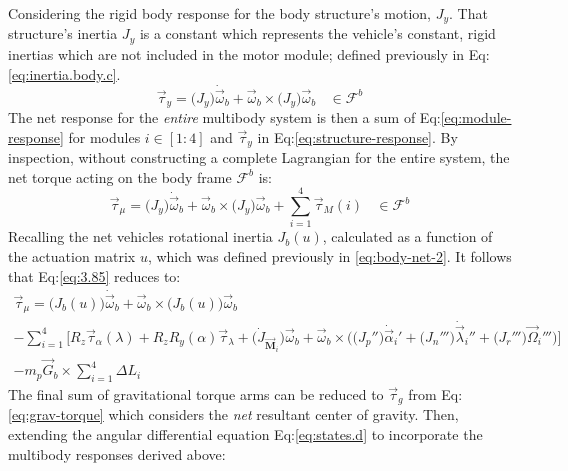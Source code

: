 Considering the rigid body response for the body structure's motion, $J_y$. That structure's inertia $J_y$ is a constant which represents the vehicle's constant, rigid inertias which are not included in the motor module; defined previously in Eq:\ref{eq:inertia.body.c}.
\begin{equation}\label{eq:structure-response}
\vec{\tau}_y=\big(J_y\big)\dot{\vec{\omega}}_b+\vec{\omega}_b\times\big(J_y\big)\vec{\omega}_b~~~~\in\mathcal{F}^b
\end{equation}
The net response for the \emph{entire} multibody system is then a sum of Eq:\ref{eq:module-response} for modules $i\in[1:4]$ and $\vec{\tau}_y$ in Eq:\ref{eq:structure-response}. By inspection, without constructing a complete Lagrangian for the entire system, the net torque acting on the body frame $\mathcal{F}^b$ is:
\begin{equation}\label{eq:3.85}
\vec{\tau}_\mu = \big(J_y\big)\dot{\vec{\omega}}_b+\vec{\omega}_b\times\big(J_y\big)\vec{\omega}_b+\sum_{i=1}^{4}\vec{\tau}_{M}(i)~~~~\in\mathcal{F}^b
\end{equation}
Recalling the net vehicles rotational inertia $J_b(u)$, calculated as a function of the actuation matrix $u$, which was defined previously in \ref{eq:body-net-2}. It follows that Eq:\ref{eq:3.85} reduces to:
\begin{multline}
\vec{\tau}_\mu=\big(J_b(u)\big)\dot{\vec{\omega}}_b+\vec{\omega}_b\times\big(J_b(u)\big)\vec{\omega}_b
\\
-\sum_{i=1}^{4}\Big[R_z\vec{\tau}_\alpha(\lambda)+R_zR_y(\alpha)\vec{\tau}_\lambda+\big(\dot{J}_{\vec{\mathbf{M}}_i}\big)\vec{\omega}_b+\vec{\omega}_b\times\Big(\big(J_p''\big)\dot{\vec{\alpha}}_i'+\big(J_n'''\big)\dot{\vec{\lambda}}_i''+\big(J_r'''\big)\vec{\Omega}_i'''\Big)\Big]
\\
-m_p\vec{G}_b\times\sum_{i=1}^{4}\Delta L_i
\end{multline}
The final sum of gravitational torque arms can be reduced to $\vec{\tau}_g$ from Eq:\ref{eq:grav-torque} which considers the \emph{net} resultant center of gravity. Then, extending the angular differential equation Eq:\ref{eq:states.d} to incorporate the multibody responses derived above:
